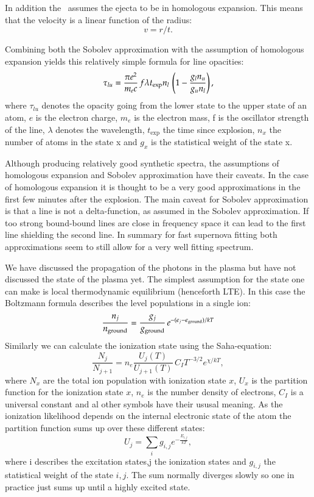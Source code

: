 In addition the \mlc\ assumes the ejecta to be in homologous expansion. This means that the velocity is a linear function of the radius:
\[
	v=  r / t.
\]

Combining both the Sobolev approximation with the assumption of homologous expansion yields this relatively simple formula for line opacities:
\[
\tau_{lu} = \frac{\pi e^2}{m_e c}\, f \lambda t_{\rm exp} n_l\, \left(1 - \frac{g_l n_u}{g_u n_l}\right), 
\]
where $\tau_{lu}$ denotes the opacity going from the lower state to the upper state of an atom, $e$ is the electron charge, $m_e$ is the electron mass, f is the oscillator strength of the line, $\lambda$ denotes the wavelength, $t_\textrm{exp}$ the time since explosion, $n_x$ the number of atoms in the state x and $g_x$ is the statistical weight of the state x.

Although producing relatively good synthetic spectra, the assumptions of homologous expansion and Sobolev approximation have their caveats. In the case of homologous expansion it is thought to be a very good approximations in the first few minutes after the explosion. The main caveat for Sobolev approximation is that a line is not a delta-function, as assumed in the Sobolev approximation. If too strong bound-bound lines are close in frequency space it can lead to the first line shielding the second line. In summary for fast supernova fitting both approximations seem to still allow for a very well fitting spectrum.

We have discussed the propagation of the photons in the plasma but have not discussed the state of the plasma yet. The simplest assumption for the state one can make is local thermodynamic equilibrium (henceforth LTE). In this case the Boltzmann formula describes the level populations in a single ion:
\[
\frac{n_j}{n_{\rm ground}} = \frac{g_j}{g_{\rm ground}}\,e^{-(\epsilon_j - \epsilon_{\rm ground})/kT}
\]
Similarly we can calculate the ionization state using the Saha-equation:
\[
	\frac{N_j}{N_{j+1}} = n_e \frac{U_j(T)}{U_{j+1}(T)}\,C_I T^{-3/2} e^{\chi/kT},
\]
where $N_x$ are the total ion population with ionization state $x$, $U_x$ is the partition function for the ionization state $x$, $n_e$ is the number density of electrons, $C_I$ is a universal constant and al other symbols have their ususal meaning. As the ionization likelihood depends on the internal electronic state of the atom the partition function sums up over these different states:
\[
U_j = \sum_i g_{i,j} e^{-\frac{E_{i,j}}{kT}},
\]
where i describes the excitation states,j the ionization states and $g_{i,j}$ the statistical weight of the state $i,j$. 
The sum normally diverges slowly so one in practice just sums up until a highly excited state.

